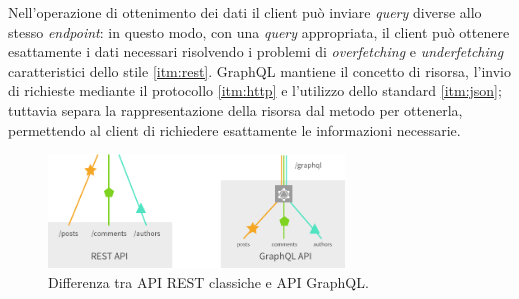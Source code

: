 Nell'operazione di ottenimento dei dati il client può inviare \textit{query} diverse allo stesso \textit{endpoint}: in questo modo, con una \textit{query} appropriata, il client può ottenere esattamente i dati necessari risolvendo i problemi di \textit{overfetching} e \textit{underfetching} caratteristici dello stile \ref{itm:rest}. GraphQL mantiene il concetto di risorsa, l'invio di richieste mediante il protocollo \ref{itm:http} e l'utilizzo dello standard \ref{itm:json}; tuttavia separa la rappresentazione della risorsa dal metodo per ottenerla, permettendo al client di richiedere esattamente le informazioni necessarie.

\begin{figure}[h!]
        \centering
        \includegraphics[width=0.7\textwidth]{figures/graphqlhttp.png}
        \caption[Differenza tra API REST classiche e API GraphQL]{Differenza tra API REST classiche e API GraphQL.
        \label{fig:graphql}}
\end{figure}   


